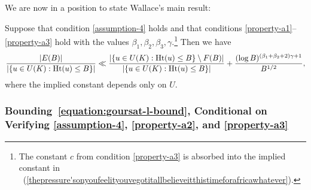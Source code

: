 We are now in a position to state Wallace's main result:
\begin{theorem} \label{theorem:wallace-hit}
	Suppose that condition \ref{assumption-4} holds and that conditions \ref{property-a1}--\ref{property-a3} hold with the values $\beta_1, \beta_2, \beta_3, \gamma$.\footnote{The constant $c$ from condition \ref{property-a3} is absorbed into the implied constant in ~(\ref{thepressure'sonyoufeelityouvegotitallbelieveitthistimeforafricawhatever}).} Then
we have 	\begin{equation}\label{thepressure'sonyoufeelityouvegotitallbelieveitthistimeforafricawhatever}
			\frac{|E(B)|}{|\{u \in U(K) : \operatorname{Ht}(u) \le B\}|} \ll \frac{|\{u \in U(K) : \operatorname{Ht}(u) \le B\} \setminus F(B)|}{|\{u \in U(K) : \operatorname{Ht}(u) \le B\}|} + \frac{(\log B)^{(\beta_1 + \beta_2 + 2)\gamma +1}}{B^{1/2}},
		\end{equation}
        where the implied constant depends only on $U$.
	\end{theorem}
	
	\subsubsection{Bounding~\ref{equation:goursat-l-bound}, Conditional on Verifying \ref{assumption-4}, \ref{property-a2}, and \ref{property-a3}}

